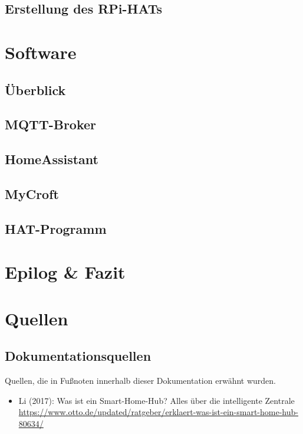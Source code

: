 \documentclass[12pt,a4paper]{article}
\begin{document}
	\subsection{Erstellung des RPi-HATs}
	\section{Software}
	\subsection{Überblick}
	\subsection{MQTT-Broker}
	\subsection{HomeAssistant}
	\subsection{MyCroft}
	\subsection{HAT-Programm}
	\section{Epilog \& Fazit}
	\newpage	
 	\section{Quellen}
 	\subsection{Dokumentationsquellen}
 	Quellen, die in Fußnoten innerhalb dieser Dokumentation erwähnt wurden.
 	\begin{itemize}
 		\item Li (2017): Was ist ein Smart-Home-Hub? Alles über die intelligente Zentrale\\ {\url{https://www.otto.de/updated/ratgeber/erklaert-was-ist-ein-smart-home-hub-80634/}}
 	\end{itemize}
\end{document}
